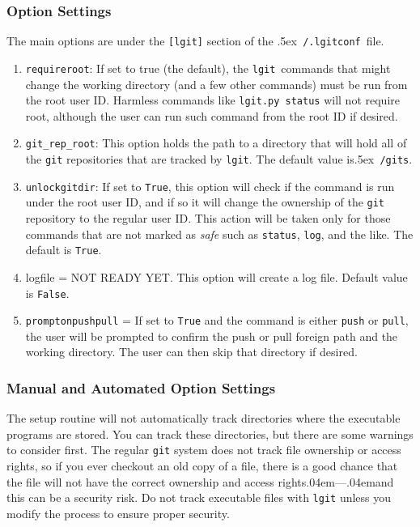 \documentclass{ltxdoc}
\def\bobtilde{\lower.5ex\hbox{\tt \string~}}%
\def\ucmd#1{{\tt {#1}}}
\def\lgitconf{\bobtilde\ucmd{/.lgitconf}}
\def\lgit{{\tt lgit}}
\def\mygits{\bobtilde\ucmd{/gits}}
\def\dash{\kern.04em{}{---}\kern.04em{}}
\begin{document}
\subsubsection{Option Settings}
The main options are under the \verb|[lgit]| section of the \lgitconf\ file.
\begin{enumerate}
  \item{\ucmd{requireroot}: If set to true (the default), the \lgit\ commands that might change the working directory (and a few other commands) must be run from the root user ID.  Harmless commands like \ucmd{lgit.py status} will not require root, although the user can run such command from the root ID if desired.}
  \item{\ucmd{git\_rep\_root}: This option holds the path to a directory that will hold all of the \ucmd{git} repositories that are tracked by \lgit. The default value is\mygits.}
  \item{\ucmd{unlockgitdir}: If set to \ucmd{True}, this option will check if the command is run under the root user ID, and if so it will change the ownership of the \ucmd{git} repository to the regular user ID.  This action will be taken only for those commands that are not marked as \emph{safe} such as \ucmd{status}, \ucmd{log}, and the like.  The default is \ucmd{True}.}
  \item{logfile = NOT READY YET.  This option will create a log file. Default value is \ucmd{False}.}
  \item{\ucmd{promptonpushpull} = If set to \ucmd{True} and the command is either \ucmd{push} or \ucmd{pull}, the user will be prompted to confirm the push or pull foreign path and the working directory.  The user can then skip that directory if desired.}
\end{enumerate}

\subsubsection{Manual and Automated Option Settings}
The setup routine will not automatically track directories where the executable programs are stored.  You can track these directories, but there are some warnings to consider first.  The regular \ucmd{git} system does not track file ownership or access rights, so if you ever checkout an old copy of a file, there is a good chance that the file will not have the correct ownership and access rights\dash and this can be a security risk. Do not track executable files with \ucmd{lgit} unless you modify the process to ensure proper security.
\end{document}
